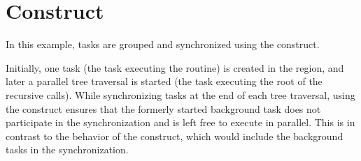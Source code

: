 \section{ Construct}
\label{sec:taskgroup}

In this example, tasks are grouped and synchronized using the  
construct.

Initially, one task (the task executing the  
routine) is created in the  region, and later a parallel tree traversal 
is started (the task executing the root of the recursive  
calls). While synchronizing tasks at the end of each tree traversal, using the 
 construct ensures that the formerly started background task 
does not participate in the synchronization and is left free to execute in parallel. 
This is in contrast to the behavior of the  construct, which would 
include the background tasks in the synchronization.



